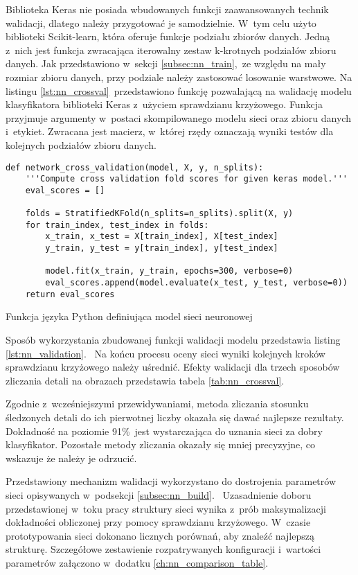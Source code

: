Biblioteka Keras nie posiada wbudowanych funkcji zaawansowanych technik
walidacji, dlatego należy przygotować je samodzielnie.
W~tym celu użyto biblioteki Scikit-learn, która oferuje funkcje podziału zbiorów
danych.
Jedną z~nich jest funkcja zwracająca iterowalny zestaw k-krotnych podziałów
zbioru danych.
Jak przedstawiono w~sekcji \ref{subsec:nn_train},~ze względu na mały rozmiar
zbioru danych, przy podziale należy zastosować losowanie warstwowe.
Na listingu \ref{lst:nn_crossval}~przedstawiono funkcję pozwalającą na walidację
modelu klasyfikatora biblioteki Keras z~użyciem sprawdzianu krzyżowego.
Funkcja przyjmuje argumenty w~postaci skompilowanego modelu sieci oraz zbioru
danych i~etykiet.
Zwracana jest macierz, w~której rzędy oznaczają wyniki testów dla kolejnych
podziałów zbioru danych.
\begin{listing}[htb]
\begin{verbatim}
def network_cross_validation(model, X, y, n_splits):
    '''Compute cross validation fold scores for given keras model.'''
    eval_scores = []

    folds = StratifiedKFold(n_splits=n_splits).split(X, y)
    for train_index, test_index in folds:
        x_train, x_test = X[train_index], X[test_index]
        y_train, y_test = y[train_index], y[test_index]

        model.fit(x_train, y_train, epochs=300, verbose=0)
        eval_scores.append(model.evaluate(x_test, y_test, verbose=0))
    return eval_scores
\end{verbatim}
\caption{Funkcja języka Python definiująca model sieci neuronowej}
\label{lst:nn_crossval}
\end{listing}
Sposób wykorzystania zbudowanej funkcji walidacji modelu przedstawia listing
\ref{lst:nn_validation}.~%
Na końcu procesu oceny sieci wyniki kolejnych kroków sprawdzianu krzyżowego
należy uśrednić.
Efekty walidacji dla trzech sposobów zliczania detali na obrazach przedstawia
tabela \ref{tab:nn_crossval}.

Zgodnie z~wcześniejszymi przewidywaniami, metoda zliczania stosunku śledzonych
detali do ich pierwotnej liczby okazała się dawać najlepsze rezultaty.
Dokładność na poziomie 91\%~jest wystarczająca do uznania sieci za dobry
klasyfikator.
Pozostałe metody zliczania okazały się mniej precyzyjne, co wskazuje że należy
je odrzucić.

Przedstawiony mechanizm walidacji wykorzystano do dostrojenia parametrów sieci
opisywanych w~podsekcji \ref{subsec:nn_build}.~%
Uzasadnienie doboru przedstawionej w~toku pracy struktury sieci wynika z~prób
maksymalizacji dokładności obliczonej przy pomocy sprawdzianu krzyżowego.
W~czasie prototypowania sieci dokonano licznych porównań, aby znaleźć najlepszą
strukturę.
Szczegółowe zestawienie rozpatrywanych konfiguracji i~wartości parametrów
załączono w~dodatku \ref{ch:nn_comparison_table}.

